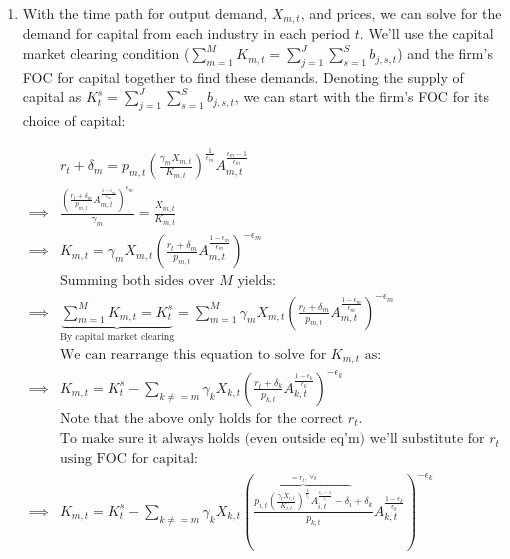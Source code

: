 \documentclass[letterpaper,12pt]{article}
\theoremstyle{definition}
\begin{document}
\begin{spacing}{1.5}
\begin{enumerate}
\item With the time path for output demand, $X_{m,t}$, and prices, we can solve for the demand for capital from each industry in each period $t$.  We'll use the capital market clearing condition ($\sum_{m=1}^{M} K_{m,t}=\sum_{j=1}^{J}\sum_{s=1}^{S} b_{j,s,t}$) and the firm's FOC for capital together to find these demands.  Denoting the supply of capital as $K^{s}_{t}=\sum_{j=1}^{J}\sum_{s=1}^{S} b_{j,s,t}$, we can start with the firm's FOC for its choice of capital:

	\begin{equation}
	\begin{split}
	& r_{t}+\delta_{m} = p_{m,t}\left(\frac{\gamma_{m}X_{m,t}}{K_{m,t}}\right)^{\frac{1}{\epsilon_{m}}}A_{m,t}^{\frac{\epsilon_{m}-1}{\epsilon_{m}}} \\
	\implies & \frac{\left(\frac{r_{t}+\delta_{m}}{p_{m,t}}A_{m,t}^{\frac{1-\epsilon_{m}}{\epsilon_{m}}}\right)^{\epsilon_{m}}}{\gamma_{m}} = \frac{X_{m,t}}{K_{m,t}} \\
	\implies &  K_{m,t} = \gamma_{m}X_{m,t} \left(\frac{r_{t}+\delta_{m}}{p_{m,t}}A_{m,t}^{\frac{1-\epsilon_{m}}{\epsilon_{m}}}\right)^{-\epsilon_{m}} \\
	& \text{Summing both sides over $M$ yields:} \\
	\implies &  \underbrace{\sum_{m=1}^{M} K_{m,t}= K^{s}_{t}}_{\text{By capital market clearing}} =\sum_{m=1}^{M} \gamma_{m}X_{m,t} \left(\frac{r_{t}+\delta_{m}}{p_{m,t}}A_{m,t}^{\frac{1-\epsilon_{m}}{\epsilon_{m}}}\right)^{-\epsilon_{m}} \\
	& \text{We can rearrange this equation to solve for $K_{m,t}$ as:}\\
	\implies & K_{m,t} = K^{s}_{t} -\sum_{k \neq=m} \gamma_{k}X_{k,t} \left(\frac{r_{t}+\delta_{k}}{p_{k,t}}A_{k,t}^{\frac{1-\epsilon_{k}}{\epsilon_{k}}}\right)^{-\epsilon_{k}}\\
	& \text{Note that the above only holds for the correct $r_{t}$.  }\\
	& \text{To make sure it always holds (even outside eq'm) we'll substitute for $r_{t}$} \\
	& \text{using FOC for capital:} \\
	\implies & K_{m,t} = K^{s}_{t} -\sum_{k \neq=m} \gamma_{k}X_{k,t} \left(\frac{\overbrace{p_{i,t}\left(\frac{\gamma_{i}X_{i,t}}{K_{i,t}}\right)^{\frac{1}{\epsilon_{i}}}A_{i,t}^{\frac{\epsilon_{i}-1}{\epsilon_{i}}}-\delta_{i}}^{=r_{t}, \ \forall i}+\delta_{k}}{p_{k,t}}A_{k,t}^{\frac{1-\epsilon_{k}}{\epsilon_{k}}}\right)^{-\epsilon_{k}}\\
	\end{split}
	\end{equation}
	

\end{enumerate}
\end{spacing}
\end{document}
